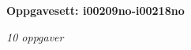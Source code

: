 \centerline{\bf Oppgavesett: i00209no-i00218no}
\vskip 10pt
\centerline{\it 10 oppgaver}\vskip 10pt
\vskip 10pt
